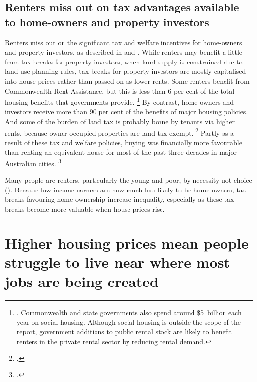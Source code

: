 \subsection{Renters miss out on tax advantages available to home-owners and property investors}\label{subsec:renters-miss-out-on-tax-advantages-available-to-home-owners-and-property-investors}

Renters miss out on the significant tax and welfare incentives for home-owners and property investors, as described in  and .
While renters may benefit a little from tax breaks for property investors, when land supply is constrained due to land use planning rules, tax breaks for property investors are mostly capitalised into house prices rather than passed on as lower rents.
Some renters benefit from Commonwealth Rent Assistance, but this is less than 6 per cent of the total housing benefits that governments provide.%
	\footnote{\textcite[][22--29]{KellyHarrisonHunterEtAl2013}. Commonwealth and state governments also spend around \$5~billion each year on social housing.
	Although social housing is outside the scope of the report, government additions to public rental stock are likely to benefit renters in the private rental sector by reducing rental demand.}
By contrast, home-owners and investors receive more than 90 per cent of the benefits of major housing policies.
And some of the burden of land tax is probably borne by tenants via higher rents, because owner-occupied properties are land-tax exempt.%
	\footcite[][210]{HenryTaxReview2010}
Partly as a result of these tax and welfare policies, buying was financially more favourable than renting an equivalent house for most of the past three decades in major Australian cities.%
	\footcite{CrowleyLi2016}
	
Many people are renters, particularly the young and poor, by necessity not choice (). Because low-income earners are now much less likely to be home-owners, tax breaks favouring home-ownership increase inequality, especially as these tax breaks become more valuable when house prices rise.

\section{Higher housing prices mean people struggle to live near where most jobs are being created}\label{sec:higher-housing-costs-mean-people-struggle-to-live-near-where-most-jobs-are-being-created}


